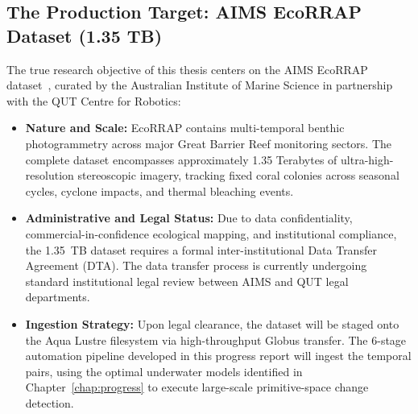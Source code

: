 \subsection{The Production Target: AIMS EcoRRAP Dataset (1.35 TB)}
The true research objective of this thesis centers on the AIMS EcoRRAP dataset~\cite{gordon2023field}, curated by the Australian Institute of Marine Science in partnership with the QUT Centre for Robotics:
\begin{itemize}
    \item \textbf{Nature and Scale:} EcoRRAP contains multi-temporal benthic photogrammetry across major Great Barrier Reef monitoring sectors. The complete dataset encompasses approximately 1.35 Terabytes of ultra-high-resolution stereoscopic imagery, tracking fixed coral colonies across seasonal cycles, cyclone impacts, and thermal bleaching events.
    \item \textbf{Administrative and Legal Status:} Due to data confidentiality, commercial-in-confidence ecological mapping, and institutional compliance, the 1.35~TB dataset requires a formal inter-institutional Data Transfer Agreement (DTA). The data transfer process is currently undergoing standard institutional legal review between AIMS and QUT legal departments.
    \item \textbf{Ingestion Strategy:} Upon legal clearance, the dataset will be staged onto the Aqua Lustre filesystem via high-throughput Globus transfer. The 6-stage automation pipeline developed in this progress report will ingest the temporal pairs, using the optimal underwater models identified in Chapter~\ref{chap:progress} to execute large-scale primitive-space change detection.
\end{itemize}
